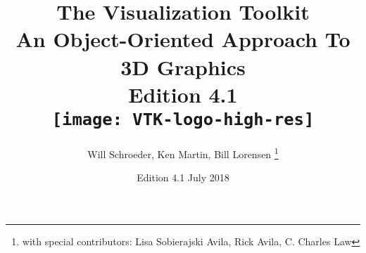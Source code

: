 \title{The Visualization Toolkit \\ An Object-Oriented Approach To 3D Graphics \\ Edition 4.1\\  \texttt{[image: VTK-logo-high-res]}\\}
\author{Will Schroeder, Ken Martin, Bill Lorensen
\thanks{with special contributors: Lisa Sobierajski Avila, Rick Avila, C. Charles Law}
\date {Edition 4.1 July 2018}
}

\clearpage\maketitle
\thispagestyle{empty}



